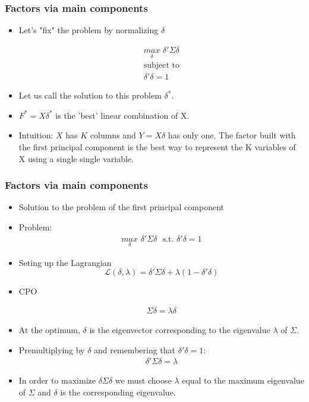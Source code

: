 \documentclass[
  shownotes,
  xcolor={svgnames},
  hyperref={colorlinks,citecolor=DarkBlue,linkcolor=DarkRed,urlcolor=DarkBlue}
  , aspectratio=169]{beamer}
\begin{document}
\begin{frame}
\frametitle{Factors via main components}

\begin{itemize}
\item Let's "fix" the problem by normalizing $\delta$

\begin{align}
\underset{\delta}{max}\,\, \delta' \Sigma \delta \\ \nonumber
\text{subject to}  \\ \nonumber
\delta' \delta = 1 \nonumber
\end{align}
\item Let us call the solution to this problem $\delta^*$. 
\medskip
\item $F^* = X\delta^*$ is the 'best' linear combination of X. 
\medskip
\item Intuition: $X$ has $K$ columns and $Y = X\delta$ has only one. The factor built with the first principal component is the best way to represent the K variables of X using a single single variable.
\end{itemize}
\end{frame}



\begin{frame}
\frametitle{Factors via main components}

\begin{itemize}


\item Solution to the problem of the first principal component
\item Problem: 
\begin{align}
\underset{\delta}{max}\,\, \delta' \Sigma \delta \,\, \text{  s.t.}  \,\, \delta' \delta = 1 \nonumber
\end{align}
\item Seting up the Lagrangian $$\mathcal{L}(\delta,\lambda) = \delta' \Sigma \delta + \lambda(1-\delta'\delta)$$

\item CPO

\begin{align}
\Sigma \delta = \lambda \delta
\end{align}

\item At the optimum, $\delta$ is the eigenvector corresponding to the eigenvalue $\lambda$ of $\Sigma$. 
\item Premultiplying by $\delta$ and  remembering that $\delta'\delta = 1$:
\begin{align}
\delta' \Sigma \delta = \lambda
\end{align}
\footnotesize
\item In order to maximize $\delta \Sigma \delta $ we must choose $\lambda$ equal to the maximum eigenvalue of $\Sigma$ and $\delta$ is the corresponding eigenvalue.
\end{itemize}
\end{frame}
\end{document}

